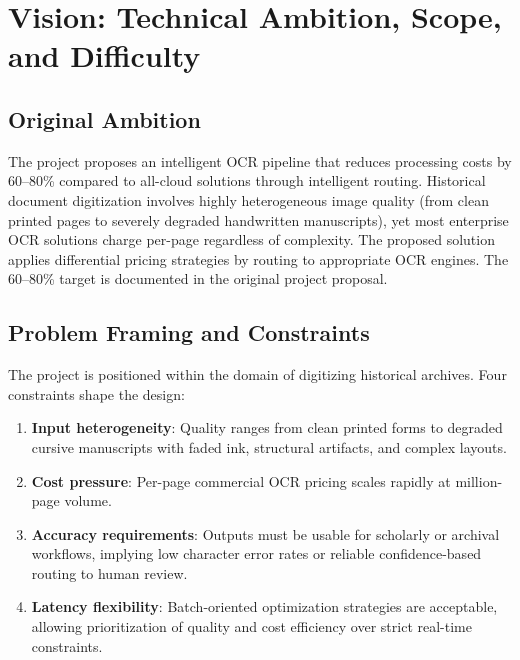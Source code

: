 \documentclass[12pt,a4paper]{article}
\begin{document}
\newpage


\section{Vision: Technical Ambition, Scope, and Difficulty}

\subsection{Original Ambition}

The project proposes an intelligent OCR pipeline that reduces
processing costs by 60--80\% compared to all-cloud solutions through
intelligent routing. Historical document digitization involves highly
heterogeneous image quality (from clean printed pages to severely
degraded handwritten manuscripts), yet most enterprise OCR solutions
charge per-page regardless of complexity. The proposed solution
applies differential pricing strategies by routing to appropriate OCR
engines. The 60--80\% target is documented in the original project
proposal.

\subsection{Problem Framing and Constraints}

The project is positioned within the domain of digitizing historical
archives. Four constraints shape the design:

\begin{enumerate}
  \item \textbf{Input heterogeneity}: Quality ranges from clean
    printed forms to degraded cursive manuscripts with faded ink,
    structural artifacts, and complex layouts.
  \item \textbf{Cost pressure}: Per-page commercial OCR pricing
    scales rapidly at million-page volume.
  \item \textbf{Accuracy requirements}: Outputs must be usable for
    scholarly or archival workflows, implying low character error
    rates or reliable confidence-based routing to human review.
  \item \textbf{Latency flexibility}: Batch-oriented optimization
    strategies are acceptable, allowing prioritization of quality and
    cost efficiency over strict real-time constraints.
\end{enumerate}
\end{document}
